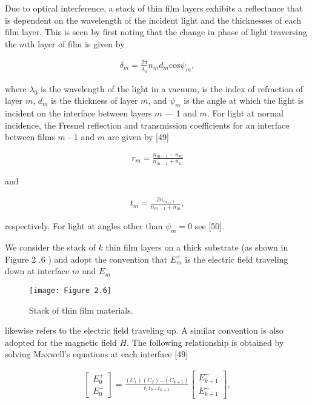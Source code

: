
\normalsize\normalfont Due to optical interference, a stack of thin film layers exhibits a reflectance that is dependent on the wavelength of the incident light and the thicknesses of each film layer. This is seen by first noting that the change in phase of light traversing the $m$th layer of film is given by


\begin{align}
	\delta_{m} = \frac{2\pi}{\lambda_{0}}n_{m}d_{m}\text{cos}\psi_{m},
\end{align}


\noindent where $\lambda_{0}$ is the wavelength of the light in a vacuum, is the index of refraction of layer $m$, $d_{m}$ is the thickness of layer $m$, and $\psi_{m}$ is the angle at which the light is incident on the interface between layers $m$ — 1 and $m$. For light at normal incidence, the Fresnel reflection and transmission coefficients for an interface between films $m$ - 1 and $m$ are given by [49]



\begin{align}
	r_{m} = \frac{n_{m-1}-n_{m}}{n_{m-1}+n_{m}}
\end{align}

\noindent and

\begin{align}
	t_{m} = \frac{2n_{m-1}}{n_{m-1}+n_{m}},
\end{align}

\noindent respectively. For light at angles other than $\psi_{m}=0$ see [50].

We consider the stack of $k$ thin film layers on a thick substrate (as shown in Figure 2 .6 )
and adopt the convention that $E_{m}^{+}$ is the electric field traveling down at interface $m$ and $E_{m}^{-}$ 


\begin{figure}[H]
	\centering
	\texttt{[image: Figure 2.6]}
	\bf\caption{ Stack of thin film materials.}
	\label{fig:2.6}
\end{figure}

\noindent likewise refers to the electric field traveling up. A similar convention is also adopted for the magnetic field $H$. The following relationship is obtained by solving Maxwell’s equations at each interface [49]


\begin{align}
	\begin{bmatrix} E_{0}^{+} \\ E_{0}^{-} \end{bmatrix} = \frac{(C_{1})(C_{2})...(C_{k+1})}{t_{1}t_{2}...t_{k+1}} \begin{bmatrix} E_{k+1}^{+} \\ E_{k+1}^{-} \end{bmatrix},
\end{align}

